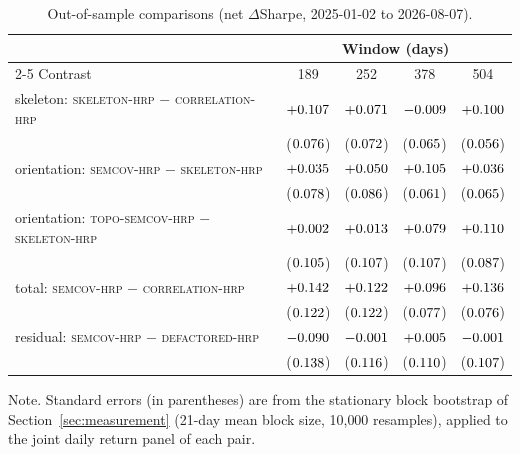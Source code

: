 \documentclass[11pt, a4paper]{report}
\newcommand{\corrhrp}{\textsc{correlation-hrp}}
\newcommand{\skelhrp}{\textsc{skeleton-hrp}}
\newcommand{\semcovhrp}{\textsc{semcov-hrp}}
\newcommand{\toposemcovhrp}{\textsc{topo-semcov-hrp}}
\newcommand{\dfhrp}{\textsc{defactored-hrp}}
\newcommand{\floatnote}[1]{\par\vspace{3pt}\begin{minipage}{0.92\textwidth}\footnotesize Note. #1\end{minipage}\par}
\begin{document}
\begin{table}[t]
  \centering
  \caption{Out-of-sample comparisons (net $\Delta$Sharpe, 2025-01-02 to 2026-08-07).}
  \label{tab:oos}
  \small
  \begin{tabular}{l c c c c}
    \toprule
    & \multicolumn{4}{c}{Window (days)} \\
    \cmidrule(lr){2-5}
    Contrast & 189 & 252 & 378 & 504 \\
    \midrule
    skeleton: \skelhrp{} $-$ \corrhrp{} & $+0.107$ & $+0.071$ & $-0.009$ & $+0.100$ \\
      & {\footnotesize($0.076$)} & {\footnotesize($0.072$)} & {\footnotesize($0.065$)} & {\footnotesize($0.056$)} \\
    \addlinespace[2pt]
    orientation: \semcovhrp{} $-$ \skelhrp{} & $+0.035$ & $+0.050$ & $+0.105$ & $+0.036$ \\
      & {\footnotesize($0.078$)} & {\footnotesize($0.086$)} & {\footnotesize($0.061$)} & {\footnotesize($0.065$)} \\
    \addlinespace[2pt]
    orientation: \toposemcovhrp{} $-$ \skelhrp{} & $+0.002$ & $+0.013$ & $+0.079$ & $+0.110$ \\
      & {\footnotesize($0.105$)} & {\footnotesize($0.107$)} & {\footnotesize($0.107$)} & {\footnotesize($0.087$)} \\
    \addlinespace[2pt]
    total: \semcovhrp{} $-$ \corrhrp{} & $+0.142$ & $+0.122$ & $+0.096$ & $+0.136$ \\
      & {\footnotesize($0.122$)} & {\footnotesize($0.122$)} & {\footnotesize($0.077$)} & {\footnotesize($0.076$)} \\
    \addlinespace[2pt]
    residual: \semcovhrp{} $-$ \dfhrp{} & $-0.090$ & $-0.001$ & $+0.005$ & $-0.001$ \\
      & {\footnotesize($0.138$)} & {\footnotesize($0.116$)} & {\footnotesize($0.110$)} & {\footnotesize($0.107$)} \\
    \bottomrule
  \end{tabular}
  \floatnote{Standard errors (in parentheses) are from the stationary block bootstrap of Section~\ref{sec:measurement} (21-day mean block size, 10{,}000 resamples), applied to the joint daily return panel of each pair.}
\end{table}
\end{document}
